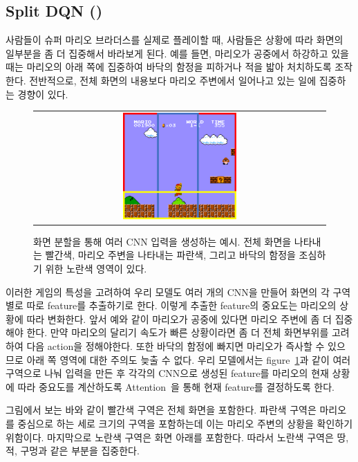 \subsection{Split DQN (\sdqnname)}
\label{sec:method:sdqn}
사람들이 슈퍼 마리오 브라더스를 실제로 플레이할 때, 사람들은 상황에 따라 화면의 일부분을 좀 더 집중해서 바라보게 된다.
예를 들면, 마리오가 공중에서 하강하고 있을 때는 마리오의 아래 쪽에 집중하여 바닥의 함정을 피하거나 적을 밟아 처치하도록 조작한다.
전반적으로, 전체 화면의 내용보다 마리오 주변에서 일어나고 있는 일에 집중하는 경향이 있다.
%
\begin{figure}[h]
\begin{center}
\begin{tabular}{c}
     \includegraphics[width=0.4\textwidth]{FIG/split_screen.pdf} \\
\end{tabular}
\caption{
	화면 분할을 통해 여러 CNN 입력을 생성하는 예시. 전체 화면을 나타내는 빨간색, 마리오 주변을 나타내는 파란색, 그리고 바닥의 함정을 조심하기 위한 노란색 영역이 있다.
}
\label{fig:split_screen}
\end{center}
\end{figure}
%
이러한 게임의 특성을 고려하여 우리 모델도 여러 개의 CNN을 만들어 화면의 각 구역별로 따로 feature를 추출하기로 한다.
이렇게 추출한 feature의 중요도는 마리오의 상황에 따라 변화한다. 앞서 예와 같이 마리오가 공중에 있다면 마리오 주변에 좀 더 집중해야 한다.
만약 마리오의 달리기 속도가 빠른 상황이라면 좀 더 전체 화면부위를 고려하여 다음 action을 정해야한다.
또한 바닥의 함정에 빠지면 마리오가 즉사할 수 있으므로 아래 쪽 영역에 대한 주의도 늦출 수 없다.
우리 모델에서는 figure~\ref{fig:split_screen}과 같이 여러 구역으로 나눠 입력을 만든 후 각각의 CNN으로 생성된 feature를 마리오의 현재 상황에 따라 중요도를 계산하도록 Attention~\cite{Attention}을 통해 현재 feature를 결정하도록 한다.

그림에서 보는 바와 같이 빨간색 구역은 전체 화면을 포함한다. 
파란색 구역은 마리오를 중심으로 하는 세로 크기의 구역을 포함하는데 이는 마리오 주변의 상황을 확인하기 위함이다.
마지막으로 노란색 구역은 화면 아래를 포함한다. 
따라서 노란색 구역은 땅, 적, 구멍과 같은 부분을 집중한다. 


